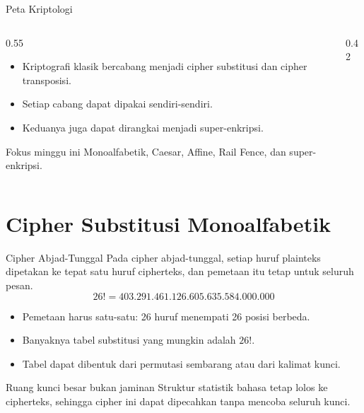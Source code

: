 \documentclass[aspectratio=169,11pt]{beamer}
\begin{document}
\begin{frame}{Peta Kriptologi}
    \begin{columns}[T,onlytextwidth]
        \begin{column}{0.55\textwidth}
            \begin{itemize}
                \item Kriptografi klasik bercabang menjadi cipher substitusi
                      dan cipher transposisi.
                \item Setiap cabang dapat dipakai sendiri-sendiri.
                \item Keduanya juga dapat dirangkai menjadi super-enkripsi.
            \end{itemize}
            \vspace{0.1cm}
            \begin{block}{Fokus minggu ini}
                \footnotesize
                Monoalfabetik, Caesar, Affine, Rail Fence, dan super-enkripsi.
            \end{block}
        \end{column}
        \begin{column}{0.42\textwidth}
            \centering
        \end{column}
    \end{columns}
\end{frame}

\section{Cipher Substitusi Monoalfabetik}

\begin{frame}{Cipher Abjad-Tunggal}
    Pada cipher abjad-tunggal, setiap huruf plainteks dipetakan ke tepat satu
    huruf cipherteks, dan pemetaan itu tetap untuk seluruh pesan.
    \[
        26! = 403.291.461.126.605.635.584.000.000
    \]
    \begin{itemize}
        \item Pemetaan harus satu-satu: 26 huruf menempati 26 posisi berbeda.
        \item Banyaknya tabel substitusi yang mungkin adalah $26!$.
        \item Tabel dapat dibentuk dari permutasi sembarang atau dari kalimat
              kunci.
    \end{itemize}
    \begin{alertblock}{Ruang kunci besar bukan jaminan}
        \footnotesize
        Struktur statistik bahasa tetap lolos ke cipherteks, sehingga cipher
        ini dapat dipecahkan tanpa mencoba seluruh kunci.
    \end{alertblock}
\end{frame}
\end{document}
